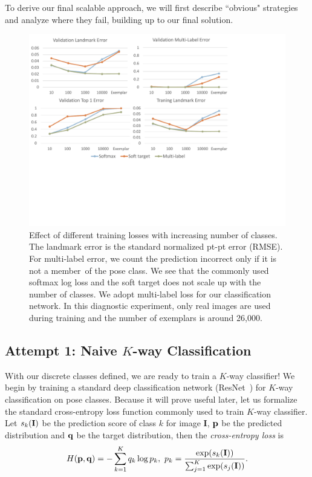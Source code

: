 \documentclass[letterpaper]{article} %
\begin{document}
To derive our final scalable approach, we will first describe ``obvious" strategies and analyze where they fail, building up to our final solution.

\begin{figure}[t!]
\begin{center}
   \includegraphics[width=1\linewidth]{fig/Loss.pdf}
\end{center}
   \caption{Effect of different training losses with increasing number of classes. The landmark error is the standard normalized pt-pt error (RMSE). For multi-label error, we count the prediction incorrect only if it is not a member\ of the pose class. We see that the commonly used softmax log loss and the soft target does not scale up with the number of classes. We adopt multi-label loss for our classification network. In this diagnostic experiment, only real images are used during training and the number of exemplars is around 26,000.}
\label{fig:increasingK}
\end{figure}

\subsection{Attempt 1: Naive $K$-way Classification}

With our discrete classes defined, we are ready to train a $K$-way classifier! We begin by training a standard deep classification network (ResNet~\cite{He2016DeepRL}) for $K$-way classification on pose classes. Because it will prove useful later, let us formalize the standard cross-entropy loss function commonly used to train $K$-way classifier. Let $s_k({\bf I})$ be the prediction score of class $k$ for image {\bf I},
 ${\bf p}$ be the predicted distribution and ${\bf q}$ be the target distribution, then the {\em cross-entropy loss} is
\begin{align}
\label{eq:crossentropy}
H({\bf p}, {\bf q}) = -\sum_{k = 1}^{K} q_k \log p_k, \ p_k = \frac{\exp(s_k({\bf I}))}{\sum_{j = 1}^{K}{\exp(s_j({\bf I}))}}.
\end{align}
\end{document}

